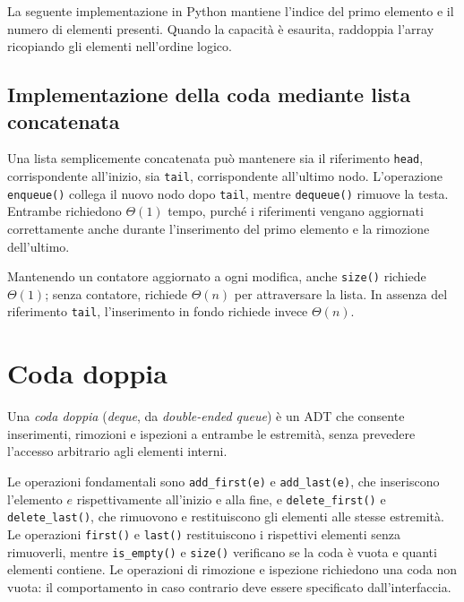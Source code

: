 La seguente implementazione in Python mantiene l'indice del
primo elemento e il numero di elementi presenti. Quando la
capacità è esaurita, raddoppia l'array ricopiando gli elementi
nell'ordine logico.



\subsection{Implementazione della coda mediante lista concatenata}
\label{sec:fi-coda-concatenata}

Una lista semplicemente concatenata può mantenere sia il
riferimento \texttt{head}, corrispondente all'inizio, sia
\texttt{tail}, corrispondente all'ultimo nodo.
L'operazione \texttt{enqueue()} collega il nuovo nodo dopo
\texttt{tail}, mentre \texttt{dequeue()} rimuove la testa.
Entrambe richiedono \(\Theta(1)\) tempo, purché i riferimenti
vengano aggiornati correttamente anche durante l'inserimento
del primo elemento e la rimozione dell'ultimo.

Mantenendo un contatore aggiornato a ogni modifica, anche
\texttt{size()} richiede \(\Theta(1)\); senza contatore,
richiede \(\Theta(n)\) per attraversare la lista. In assenza
del riferimento \texttt{tail}, l'inserimento in fondo richiede
invece \(\Theta(n)\).

\section{Coda doppia}
\label{sec:fi-adt-deque}

\begin{definition}
\label{def:fi-adt-deque}
Una \emph{coda doppia} (\emph{deque}, da \emph{double-ended queue})
è un ADT che consente inserimenti, rimozioni e ispezioni a entrambe
le estremità, senza prevedere l'accesso arbitrario agli elementi
interni.
\end{definition}

Le operazioni fondamentali sono \texttt{add\_first(e)} e
\texttt{add\_last(e)}, che inseriscono l'elemento \(e\)
rispettivamente all'inizio e alla fine, e
\texttt{delete\_first()} e \texttt{delete\_last()},
che rimuovono e restituiscono gli elementi alle stesse estremità.
Le operazioni \texttt{first()} e \texttt{last()} restituiscono
i rispettivi elementi senza rimuoverli, mentre
\texttt{is\_empty()} e \texttt{size()} verificano se la coda
è vuota e quanti elementi contiene. Le operazioni di rimozione
e ispezione richiedono una coda non vuota: il comportamento
in caso contrario deve essere specificato dall'interfaccia.

